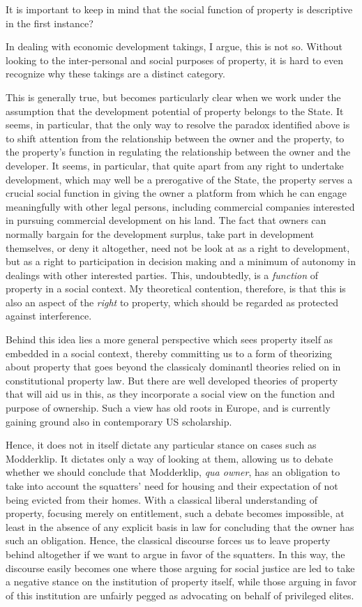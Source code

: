 It is important to keep in mind that the social function of property is descriptive in the first instance?

In dealing with economic development takings, I argue, this is not so. Without looking to the inter-personal and social purposes of property, it is hard to even recognize why these takings are a distinct category.

This is generally true, but becomes particularly clear when we work under the assumption that the development potential of property belongs to the State. It seems, in particular, that the only way to resolve the paradox identified above is to shift attention from the relationship between the owner and the property, to the property's function in regulating the relationship between the owner and the developer. It seems, in particular, that quite apart from any right to undertake development, which may well be a prerogative of the State, the property serves a crucial social function in giving the owner a platform from which he can engage meaningfully with other legal persons, including commercial companies interested in pursuing commercial development on his land. The fact that owners can normally bargain for the development surplus, take part in development themselves, or deny it altogether, need not be look at as a right to development, but as a right to participation in decision making and a minimum of autonomy in dealings with other interested parties. This, undoubtedly, is a {\it function} of property in a social context. My theoretical contention, therefore, is that this is also an aspect of the {\it right} to property, which should be regarded as protected against interference. 

Behind this idea lies a more general perspective which sees property itself as embedded in a social context, thereby committing us to a form of theorizing about property that goes beyond the classicaly dominantl theories relied on in constitutional property law. But there are well developed theories of property that will aid us in this, as they incorporate a social view on the function and purpose of ownership. Such a view has old roots in Europe, and is currently gaining ground also in contemporary US scholarship. 

Hence, it does not in itself dictate any particular stance on cases such as Modderklip. It dictates only a way of looking at them, allowing us to debate whether we should conclude that Modderklip, {\it qua owner}, has an obligation to take into account the squatters' need for housing and their expectation of not being evicted from their homes. With a classical liberal understanding of property, focusing merely on entitlement, such a debate becomes impossible, at least in the absence of any explicit basis in law for concluding that the owner has such an obligation. Hence, the classical discourse forces us to leave property behind altogether if we want to argue in favor of the squatters. In this way, the discourse easily becomes one where those arguing for social justice are led to take a negative stance on the institution of property itself, while those arguing in favor of this institution are unfairly pegged as advocating on behalf of privileged elites.

